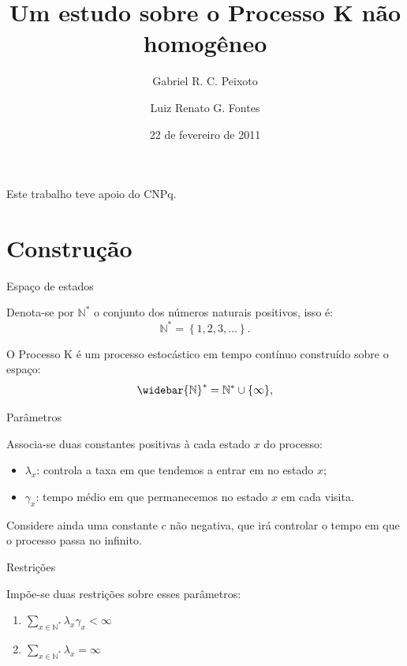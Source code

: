 \documentclass[xcolor=pdftex,dvipsnames]{beamer}
\title{Um estudo sobre o Processo K não homogêneo}
\author[Peixoto, G. R. C. \and Fontes L. R. G.]
{Gabriel R. C. Peixoto \and Luiz Renato G. Fontes}
\institute[IME-USP]{Instituto de Matemática e Estatística da
  Universidade de São Paulo}
\date{22 de fevereiro de 2011}
\newcommand{\Nz}{{\mathbb{N^*}}}
\newcommand{\Nzb}{{\mathbb{\widebar{N}^*}}}
\begin{document}
\begin{frame}[plain]
  \titlepage
  
  \begin{center}
    Este trabalho teve apoio do CNPq.
  \end{center}
\end{frame}

\section{Construção}


\begin{frame}{Espaço de estados}

  Denota-se por $\Nz$ o conjunto dos números naturais positivos, isso
  é:
  \begin{displaymath}
    \Nz = \left\{ 1, 2, 3, \ldots \right\}.
  \end{displaymath}


  O Processo K é um processo estocástico em tempo contínuo construído
  sobre o espaço:
  \begin{displaymath}
    \Nzb = \Nz \cup \{ \infty \},
  \end{displaymath}

\end{frame}

\begin{frame}{Parâmetros}

  Associa-se duas constantes positivas à cada estado $x$ do processo:

  \begin{itemize}
  \item $\lambda_x$: controla a taxa em que tendemos a entrar em no
    estado $x$;
    
  \item $\gamma_x$: tempo médio em que permanecemos no estado $x$ em
    cada visita.
  \end{itemize}

  Considere ainda uma constante $c$ não negativa, que irá controlar 
  o tempo em que o processo passa no infinito.

\end{frame}

\begin{frame}{Restrições}

  Impõe-se duas restrições sobre esses parâmetros:
  \begin{block}{}
    \begin{enumerate}
    \item $ \displaystyle \sum_{x\in \Nz} \lambda_x \gamma_x <
      \infty $
      \bigskip
    \item $ \displaystyle \sum_{x\in \Nz} \lambda_x = \infty $
    \end{enumerate}
  \end{block}
\end{frame}
\end{document}
